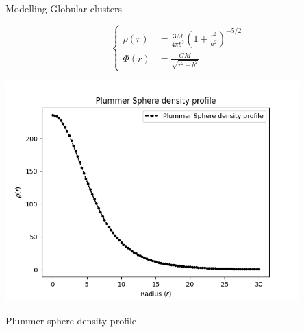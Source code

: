 \documentclass[final]{beamer}
\newlength{\colwidth}
\begin{document}
\begin{frame}[t]
\begin{columns}[t]
\begin{column}{\colwidth}
\begin{block}{Modelling Globular clusters}
\begin{minipage}[c]{0.45\textwidth}
\begin{equation}\label{eq:plummer_potential_density_pair}
    \begin{cases}
        \rho (r) & = \displaystyle{\frac{3M}{4\pi b^3}} \left (1 + \displaystyle{\frac{r^2}{a^2}}\right)^{-5/2} \\
        \Phi(r)  & = \displaystyle{\frac{GM}{\sqrt{r^2 + b^2}}}
    \end{cases}
\end{equation}
\end{minipage}
\begin{minipage}[l]{0.45\textwidth}
\includegraphics[width = 0.85\textwidth]{images/Plummer Sphere density profile.png}
\caption{Plummer sphere density profile}
\end{minipage}


\end{block}
\end{column}
\end{columns}
\end{frame}
\end{document}
